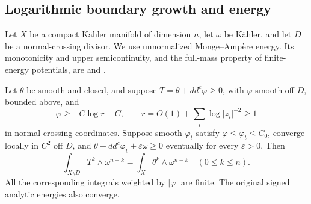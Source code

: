 \subsection{Logarithmic boundary growth and energy}
\label{sec:boundary-energy}

Let $X$ be a compact Kähler manifold of dimension $n$, let $\omega$
be Kähler, and let $D$ be a normal-crossing divisor. We use unnormalized
Monge--Ampère energy. Its monotonicity and upper semicontinuity, and the
full-mass property of finite-energy potentials, are
\cite[Propositions~2.10--2.11]{boundary-begz} and
\cite[Propositions~2.4 and~2.8]{boundary-bbgz}.

\begin{lemma}\label{lem:boundary-energy}
Let $\theta$ be smooth and closed, and suppose
$T=\theta+dd^c\varphi\geq0$, with $\varphi$ smooth off $D$,
bounded above, and
\[
 \varphi\geq-C\log r-C,\qquad
 r=O(1)+\sum_i\log|z_i|^{-2}\geq1
\]
in normal-crossing coordinates. Suppose smooth $\varphi_t$ satisfy
$\varphi\leq\varphi_t\leq C_0$, converge locally in $C^2$ off $D$,
and $\theta+dd^c\varphi_t+\varepsilon\omega\geq0$ eventually for
every $\varepsilon>0$. Then
\[
 \int_{X\setminus D}T^k\wedge\omega^{n-k}
      =\int_X\theta^k\wedge\omega^{n-k}\quad(0\leq k\leq n).
\]
All the corresponding integrals weighted by $|\varphi|$ are finite.
The original signed analytic energies also converge.
\end{lemma}

